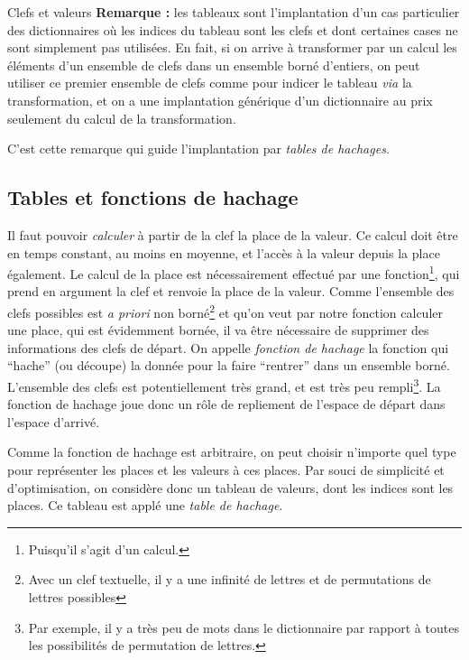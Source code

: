\documentclass[../../../main.tex]{subfiles}
\begin{document}
\begin{definition}{Clefs et valeurs}
\textbf{Remarque :} les tableaux sont l'implantation d'un cas particulier des dictionnaires où les indices du tableau sont les clefs et dont certaines cases ne sont simplement pas utilisées. En fait, si on arrive à transformer par un calcul les éléments d'un ensemble de clefs dans un ensemble borné d'entiers, on peut utiliser ce premier ensemble de clefs comme pour indicer le tableau \textit{via} la transformation, et on a une implantation générique d'un dictionnaire au prix seulement du calcul de la transformation.

C'est cette remarque qui guide l'implantation par \textit{tables de hachages}. 
\subsection{Tables et fonctions de hachage}
Il faut pouvoir \textit{calculer} à partir de la clef la place de la valeur. Ce calcul doit être en temps constant, au moins en moyenne, et l'accès à la valeur depuis la place également. Le calcul de la place est nécessairement effectué par une fonction\footnote{Puisqu'il s'agit d'un calcul.}, qui prend en argument la clef et renvoie la place de la valeur. Comme l'ensemble des clefs possibles est \textit{a priori} non borné\footnote{Avec un clef textuelle, il y a une infinité de lettres et de permutations de lettres possibles} et qu'on veut par notre fonction calculer une place, qui est évidemment bornée, il va être nécessaire de supprimer des informations des clefs de départ. On appelle \textit{fonction de hachage} la fonction qui ``hache'' (ou découpe) la donnée pour la faire ``rentrer'' dans un ensemble borné. L'ensemble  des clefs est potentiellement très grand, et est très peu rempli\footnote{Par exemple, il y a très peu de mots dans le dictionnaire par rapport à toutes les possibilités de permutation de lettres.}. La fonction de hachage joue donc un rôle de repliement de l'espace de départ dans l'espace d'arrivé.

Comme la fonction de hachage est arbitraire, on peut choisir n'importe quel type pour représenter les places et les valeurs à ces places. Par souci de simplicité et d'optimisation, on considère donc un tableau de valeurs, dont les indices sont les places. Ce tableau est applé une \textit{table de hachage}.


\end{definition}
\end{document}
